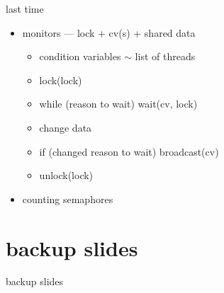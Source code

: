 \date{}
\title{}
\date{}

\begin{frame}
    \titlepage
\end{frame}


\begin{frame}{last time}
    \begin{itemize}
    \item monitors  --- lock + cv(s) + shared data
        \begin{itemize}
        \item condition variables $\sim$ list of threads
        \item lock(lock)
        \item while (reason to wait) wait(cv, lock)
        \item change data
        \item if (changed reason to wait) broadcast(cv)
        \item unlock(lock)
        \end{itemize}
    \item counting semaphores 
    \end{itemize}
\end{frame}





\section{backup slides}
\begin{frame}{backup slides}
\end{frame}






